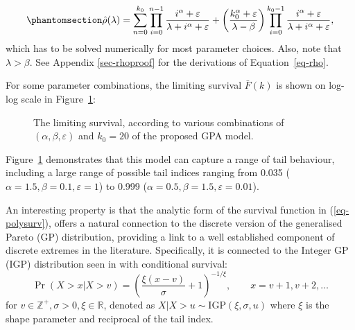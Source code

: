 \documentclass[
  sn-basic,
  10pt,
]{sn-jnl}
\theoremstyle{thmstyleone}
\theoremstyle{thmstyleone}
\theoremstyle{remark}
\theoremstyle{plain}
\theoremstyle{plain}
\theoremstyle{remark}
\begin{document}
\begin{equation}\phantomsection\label{eq-rho}{
\hat\rho(\lambda) = \sum_{n=0}^{k_0}\prod_{i=0}^{n-1}\frac{i^\alpha + \varepsilon}{\lambda+i^\alpha + \varepsilon} + \left(\frac{k_0^\alpha + \varepsilon}{\lambda-\beta}\right)\prod_{i=0}^{k_0-1}\frac{i^\alpha + \varepsilon}{\lambda + i^\alpha + \varepsilon}, 
}\end{equation} which has to be solved numerically for most parameter
choices. Also, note that \(\lambda>\beta\). See Appendix
\ref{sec-rhoproof} for the derivations of Equation~\ref{eq-rho}.

For some parameter combinations, the limiting survival \(\bar F(k)\) is
shown on log-log scale in Figure~\ref{fig-polylinsurv}:

\begin{figure}


\caption{\label{fig-polylinsurv}The limiting survival, according to
various combinations of \((\alpha, \beta, \varepsilon)\) and \(k_0=20\)
of the proposed GPA model.}

\end{figure}%

Figure~\ref{fig-polylinsurv} demonstrates that this model can capture a
range of tail behaviour, including a large range of possible tail
indices ranging from 0.035 (\(\alpha=1.5, \beta=0.1, \varepsilon=1\)) to
0.999 (\(\alpha=0.5, \beta=1.5, \varepsilon=0.01\)).

An interesting property is that the analytic form of the survival
function in (\ref{eq-polysurv}), offers a natural connection to the
discrete version of the generalised Pareto (GP) distribution, providing
a link to a well established component of discrete extremes in the
literature. Specifically, it is connected to the Integer GP (IGP)
distribution seen in \citet{Rohrbeck_2018} with conditional survival: \[
\Pr(X> x|X> v) = \left(\frac{\xi(x-v)}{\sigma} + 1\right)^{-1/\xi},\qquad  x=v+1,v+2,\ldots
\] for \(v\in\mathbb Z^+, \sigma>0,\xi\in \mathbb R\), denoted as
\(X|X>u \sim  \mathrm {IGP}(\xi, \sigma, u)\) where \(\xi\) is the shape
parameter and reciprocal of the tail index.
\end{document}
